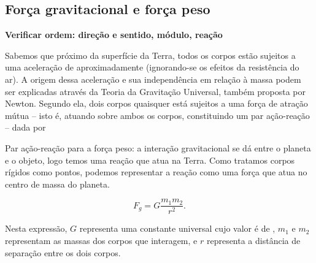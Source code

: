 \subsection{Força gravitacional e força peso} 

\textbf{Verificar ordem: direção e sentido, módulo, reação}

Sabemos que próximo da superfície da Terra, todos os corpos estão sujeitos a uma aceleração de aproximadamente  (ignorando-se os efeitos da resistência do ar). A origem dessa aceleração e sua independência em relação à massa podem ser explicadas através da Teoria da Gravitação Universal, também proposta por Newton. Segundo ela, dois corpos quaisquer está sujeitos a uma força de atração mútua -- isto é, atuando sobre ambos os corpos, constituindo um par ação-reação -- dada por

\begin{marginfigure}
\centering
{}
\caption{Par ação-reação para a força peso: a interação gravitacional se dá entre o planeta e o objeto, logo temos uma reação que atua na Terra. Como tratamos corpos rígidos como pontos, podemos representar a reação como uma força que atua no centro de massa do planeta.}
\end{marginfigure}

\begin{equation}\label{Eq:LeiGravitacaoUniversal}
  F_g = G \frac{m_1 m_2}{r^2}.
\end{equation}

\noindent{}Nesta expressão, $G$ representa uma constante universal cujo valor é de , $m_1$ e $m_2$ representam as massas dos corpos que interagem, e $r$ representa a distância de separação entre os dois corpos.


